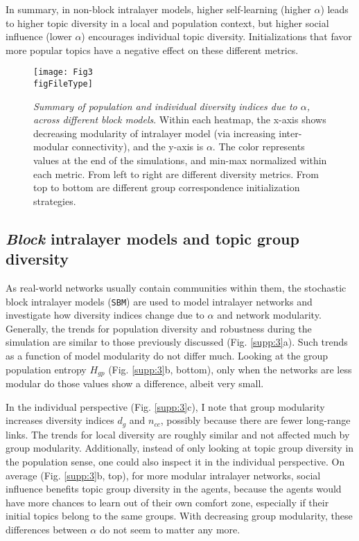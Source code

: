 \documentclass{svproc}
\def\figFileType{.eps}
\begin{document}
In summary, in non-block intralayer models,
    higher self-learning (higher $\alpha$) leads to higher topic diversity in a local and population context,
    but higher social influence (lower $\alpha$) encourages individual topic diversity.
Initializations that favor more popular topics have a negative effect on these different metrics.

\begin{figure}[!ht]
    \centering
    \texttt{[image: Fig3\\figFileType]}
    \caption{
    \textit{Summary  of  population  and  individual  diversity  indices  due  to $\alpha$,  across  different  block  models}.
    Within each heatmap, the x-axis shows decreasing modularity of intralayer model (via increasing inter-modular connectivity), and the y-axis is $\alpha$.
    The color represents values at the end of the simulations, and min-max normalized within each metric.
    From left to right are different diversity metrics. From top to bottom are different group correspondence initialization strategies.
    }
    \label{fig:3}
\end{figure}


\subsection{\textit{Block} intralayer models and topic group diversity}
\label{results:block}

As real-world networks usually contain communities within them,
    the stochastic block intralayer models (\texttt{SBM}) are used to model intralayer networks
    and investigate how diversity indices change due to $\alpha$ and network modularity.
Generally, the trends for population diversity and robustness during the simulation are similar to those previously discussed (Fig. \ref{supp:3}a).
Such trends as a function of model modularity do not differ much.
Looking at the group population entropy $H_{gp}$ (Fig. \ref{supp:3}b, bottom), only when the networks are less modular do those values show a difference, albeit very small.

In the individual perspective (Fig. \ref{supp:3}c),
    I note that group modularity increases diversity indices $d_g$ and $n_{cc}$, possibly because there are fewer long-range links.
The trends for local diversity are roughly similar and not affected much by group modularity.
Additionally, instead of only looking at topic group diversity in the population sense, one could also inspect it in the individual perspective.
On average (Fig. \ref{supp:3}b, top),
    for more modular intralayer networks,
    social influence benefits topic group diversity in the agents,
    because the agents would have more chances to learn out of their own comfort zone,
    especially if their initial topics belong to the same groups.
With decreasing group modularity, these differences between $\alpha$ do not seem to matter any more.
\end{document}
